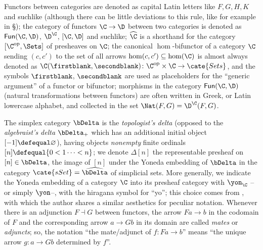 Functors between categories are denoted as capital Latin letters like $F,G,H,K$ and suchlike (although there can be little deviations to this rule, like for example in \S{}); the category of functors $\C\to \D$ between two categories is denoted as $\textsf{Fun}(\C,\D)$, $\D^{\C}$, $[\C,\D]$ and suchlike; $\widehat{\C}$ is a shorthand for the category $[\C^\text{op},\Sets]$ of presheaves on $\C$; the canonical $\hom$\hyp{}bifunctor of a category $\C$ sending $(c,c')$ to the set of all arrows $\hom(c,c')\subseteq\hom(\C)$ is almost always denoted as $\C(\firstblank,\secondblank)\colon \C^\text{op}\times\C\to\cate{Sets}$, and the symbols $\firstblank$, $\secondblank$ are used as placeholders for the ``generic argument'' of a functor or bifunctor; morphisms in the category $\textsf{Fun}(\C,\D)$ (\ie natural transformations between functors) are often written in Greek, or Latin lowercase alphabet, and collected in the set $\Nat(F,G) = \D^{\C}(F,G)$. 

The simplex category $\bDelta$ is the \emph{topologist's delta} (opposed to the \emph{algebraist's delta} $\bDelta_+$ which has an additional initial object $[-1]\defequal \varnothing$), having objects \emph{nonempty} finite ordinals $[n]\defequal\{0<1\dots<n\}$; we denote $\Delta[n]$ the representable presheaf on $[n]\in\bDelta$, \ie the image of $[n]$ under the Yoneda embedding of $\bDelta$ in the category $\cate{sSet} = \widehat{\bDelta}$ of simplicial sets. More generally, we indicate the Yoneda embedding of a category $\C$ into its presheaf category with $\yon_\C$ --or simply $\yon$--, \ie with the hiragana symbol for ``yo''; this choice comes from \cite{Libland2015}, with which the author shares a similar aesthetics for peculiar notation. Whenever there is an adjunction $F\dashv G$ between functors, the arrow $Fa\to b$ in the codomain of $F$ and the corresponding arrow $a\to Gb$ in its domain are called \emph{mates} or \emph{adjuncts}; so, the notation ``the mate/adjunct of $f\colon Fa\to b$'' means ``the unique arrow $g\colon a\to Gb$ determined by $f$''. 

